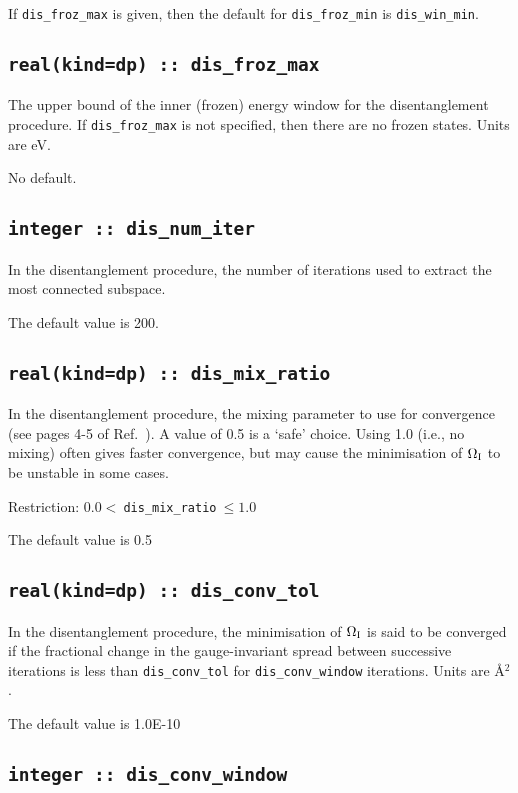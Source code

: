 If \verb#dis_froz_max# is given, then the default for 
\verb#dis_froz_min# is \verb#dis_win_min#.


\subsection[dis\_froz\_max]{\tt real(kind=dp) :: dis\_froz\_max}
The upper bound of the inner (frozen) energy window for the
disentanglement procedure. If \verb#dis_froz_max# is not specified,
then there are no frozen states. Units are eV.

No default.

\subsection[dis\_num\_iter]{\tt integer :: dis\_num\_iter}
In the disentanglement procedure, the
number of iterations used to extract the most connected subspace.

The default value is 200.

\subsection[dis\_mix\_ratio]{\tt real(kind=dp) :: dis\_mix\_ratio}
In the disentanglement procedure, the mixing parameter to use for
convergence (see pages 4-5 of Ref.~\cite{souza-prb01}). A value of 0.5
is a `safe' choice. Using 1.0 (i.e., no mixing) often gives faster
convergence, but may cause the minimisation of $\Omega_{\mathrm{I}}$ to be unstable
in some cases.

Restriction: $0.0<\:${\tt dis\_mix\_ratio}$\:\leq 1.0$

The default value is 0.5 

\subsection[dis\_conv\_tol]{\tt real(kind=dp) :: dis\_conv\_tol}

In the disentanglement procedure, the minimisation of $\Omega_{\mathrm{I}}$ is said
to be converged if the fractional change in the gauge-invariant spread
between successive iterations is less than
\verb#dis_conv_tol# for \verb#dis_conv_window# iterations. Units are \AA$^2$.

The default value is 1.0E-10


\subsection[dis\_conv\_window]{\tt integer :: dis\_conv\_window}

